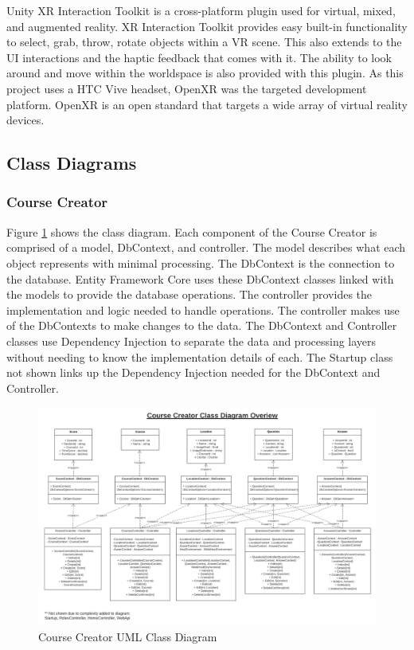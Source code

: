 Unity XR Interaction Toolkit is a cross-platform plugin used for virtual, mixed, and augmented reality. XR Interaction Toolkit provides easy built-in functionality to select, grab, throw, rotate objects within a VR scene. This also extends to the UI interactions and the haptic feedback that comes with it. The ability to look around and move within the worldspace is also provided with this plugin. As this project uses a HTC Vive headset, OpenXR was the targeted development platform. OpenXR is an open standard that targets a wide array of virtual reality devices.

\subsection{Class Diagrams}

\subsubsection{Course Creator}

Figure \ref{Course Creator UML Class Diagram} shows the class diagram. Each component of the Course Creator is comprised of a model, DbContext, and controller. The model describes what each object represents with minimal processing. The DbContext is the connection to the database. Entity Framework Core uses these DbContext classes linked with the models to provide the database operations. The controller provides the implementation and logic needed to handle operations. The controller makes use of the DbContexts to make changes to the data. The DbContext and Controller classes use Dependency Injection to separate the data and processing layers without needing to know the implementation details of each. The Startup class not shown links up the Dependency Injection needed for the DbContext and Controller. 

\begin{figure}[htb]
	\centering
	\includegraphics[width=.9\textwidth]{Design/assets/course-creator-class-diagram.png}
	\caption[Course Creator UML Class Diagram]{\label{Course Creator UML Class Diagram}Course Creator UML Class Diagram}
\end{figure}
\clearpage

